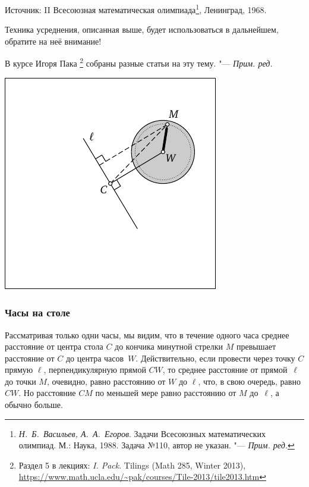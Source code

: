 \documentclass[twoside]{book}
\newcommand\VsMO{\emph{Н.~Б.~Васильев, А.~А.~Егоров}. Задачи Всесоюзных математических олимпиад. М.: Наука, 1988}
\newenvironment{addedbytheeditors}{\par\medskip\small
}{\par\addvspace{\medskipamount}} %
\begin{document}
\medskip
{%
Источник: II Всесоюзная математическая олимпиада\footnote{%
\VsMO. Задача №110, автор не указан. "--- \emph{Прим. ред.}}, Ленинград, 1968.
}

Техника усреднения, описанная выше, будет использоваться в дальнейшем, обратите на неё внимание!

\begin{addedbytheeditors}
В курсе Игоря Пака%
\footnote{Раздел 5 в лекциях: \emph{I. Pack}. Tilings (Math 285, Winter 2013), \url{https://www.math.ucla.edu/~pak/courses/Tile-2013/tile2013.htm} }
собраны разные статьи на эту тему.
"--- \emph{Прим. ред.}
\end{addedbytheeditors}

\hbox{\includegraphics[scale=.75]{mp/wink-3}}
\begin{figure}
\end{figure}

\subsubsection*{Часы на столе} %

Рассматривая только одни часы, 
мы видим, что в течение одного часа среднее расстояние от центра стола $C$ до кончика минутной стрелки $M$ превышает расстояние от $C$ до центра часов~$W$.
Действительно, если провести через точку $C$ прямую $\ell$, перпендикулярную прямой $CW$, 
то среднее расстояние от прямой~$\ell$ до точки $M$, очевидно, равно расстоянию от $W$ до $\ell$,
что, в свою очередь, равно $CW$.
Но расстояние $CM$ по меньшей мере равно расстоянию от $M$ до~$\ell$, а обычно больше.
\end{document}
